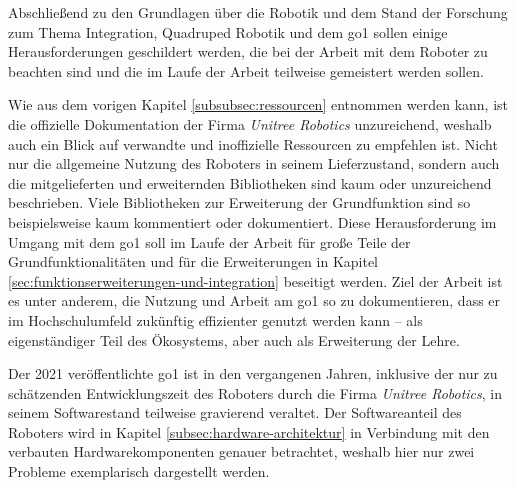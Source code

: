 Abschließend zu den Grundlagen über die Robotik und dem Stand der Forschung zum Thema Integration, Quadruped Robotik und dem \gls{go1}
sollen einige Herausforderungen geschildert werden, die bei der Arbeit mit dem Roboter zu beachten sind und die im Laufe
der Arbeit teilweise gemeistert werden sollen.



Wie aus dem vorigen Kapitel \ref{subsubsec:ressourcen} entnommen werden kann, ist die offizielle Dokumentation der Firma
\emph{Unitree Robotics} unzureichend, weshalb auch ein Blick auf verwandte und inoffizielle Ressourcen zu empfehlen ist.
Nicht nur die allgemeine Nutzung des Roboters in seinem Lieferzustand, sondern auch die mitgelieferten und erweiternden
Bibliotheken sind kaum oder unzureichend beschrieben.
Viele Bibliotheken zur Erweiterung der Grundfunktion sind so beispielsweise kaum kommentiert oder dokumentiert.
Diese Herausforderung im Umgang mit dem \gls{go1} soll im Laufe der Arbeit für große Teile der Grundfunktionalitäten und für die Erweiterungen
in Kapitel \ref{sec:funktionserweiterungen-und-integration} beseitigt werden.
Ziel der Arbeit ist es unter anderem, die Nutzung und Arbeit am \gls{go1} so zu dokumentieren, dass er im Hochschulumfeld
zukünftig effizienter genutzt werden kann -- als eigenständiger Teil des Ökosystems, aber auch als Erweiterung der Lehre.



Der \num{2021} veröffentlichte \gls{go1} ist in den vergangenen Jahren, inklusive der nur zu schätzenden Entwicklungszeit
des Roboters durch die Firma \emph{Unitree Robotics}, in seinem Softwarestand teilweise gravierend veraltet.
Der Softwareanteil des Roboters wird in Kapitel \ref{subsec:hardware-architektur} in Verbindung mit den verbauten
Hardwarekomponenten genauer betrachtet, weshalb hier nur zwei Probleme exemplarisch dargestellt werden.


